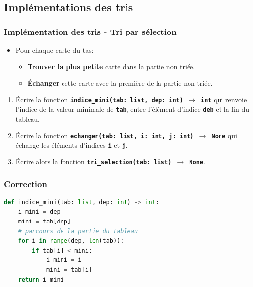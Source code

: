 \documentclass[svgnames,11pt]{beamer}
\begin{document}
\subsection{Implémentations des tris}
\begin{frame}
    \frametitle{Implémentation des tris - Tri par sélection}

    \begin{itemize}
        \item Pour chaque carte du tas:
              \begin{itemize}
                  \item \textbf{Trouver la plus petite} carte dans la partie non triée.
                  \item \textbf{Échanger} cette carte avec la première de la partie non triée.
              \end{itemize}

    \end{itemize}

    \begin{activite}
        \begin{enumerate}
            \item Écrire la fonction \textbf{\texttt{indice\_mini(tab: list, dep: int) $\rightarrow$ int}} qui renvoie l'indice de la valeur minimale de \textbf{\texttt{tab}}, entre l'élément d'indice \textbf{\texttt{deb}} et la fin du tableau.
            \item Écrire la fonction \textbf{\texttt{echanger(tab: list, i: int, j: int) $\rightarrow$ None}} qui échange les éléments d'indices \textbf{\texttt{i}} et \textbf{\texttt{j}}.
            \item Écrire alors la fonction \textbf{\texttt{tri\_selection(tab: list) $\rightarrow$ None}}.
        \end{enumerate}
    \end{activite}

\end{frame}
\begin{frame}[fragile]
    \frametitle{Correction}

    \begin{center}
        \begin{lstlisting}[language=Python , basicstyle=\ttfamily\small, xleftmargin=2em, xrightmargin=0em]
def indice_mini(tab: list, dep: int) -> int:
    i_mini = dep
    mini = tab[dep]
    # parcours de la partie du tableau
    for i in range(dep, len(tab)):
        if tab[i] < mini:
            i_mini = i
            mini = tab[i]
    return i_mini
\end{lstlisting}
    \end{center}

\end{frame}
\end{document}
